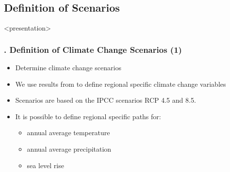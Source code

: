 \documentclass[11pt,aspectratio=169]{beamer}
\begin{document}
\subsection{Definition of Scenarios}
\begin{frame}<presentation>
	\frametitle{{\thesection.\thesubsection} Definition of Climate Change Scenarios (1)}
	\begin{itemize}
		\item Determine climate change scenarios
		\item We use results from \cite{thuc2016climate} to define regional specific climate change variables
		\item Scenarios are based on the IPCC scenarios RCP 4.5 and 8.5.
		\item It is possible to define regional specific paths for:
			\begin{itemize}
				\item annual average temperature 
				\item annual average precipitation
				\item sea level rise
			\end{itemize}

	\end{itemize}
\end{frame}
\end{document}
